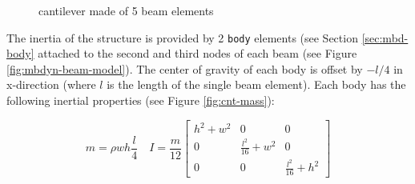 \begin{figure}[htbp!]
	    \centering
    	\caption{cantilever made of 5 beam elements}
		\label{fig:cnt-beams}
\end{figure}

The inertia of the structure is provided by 2 \texttt{body} elements (see Section \ref{sec:mbd-body} attached to the second and third nodes of each beam (see Figure \ref{fig:mbdyn-beam-model}). The center of gravity of each body is offset by $-l/4$ in x-direction (where $l$ is the length of the single beam element). Each body has the following inertial properties (see Figure \ref{fig:cnt-mass}): 

\begin{equation}
    m = \rho wh \frac{l}{4} \quad I = \frac{m}{12} \begin{bmatrix} h^2+w^2 & 0 & 0 \\ 0 & \frac{l^2}{16} + w^2 & 0 \\ 0 & 0 & \frac{l^2}{16} + h^2 \end{bmatrix}
    \label{eq:body-inertia}
\end{equation}



